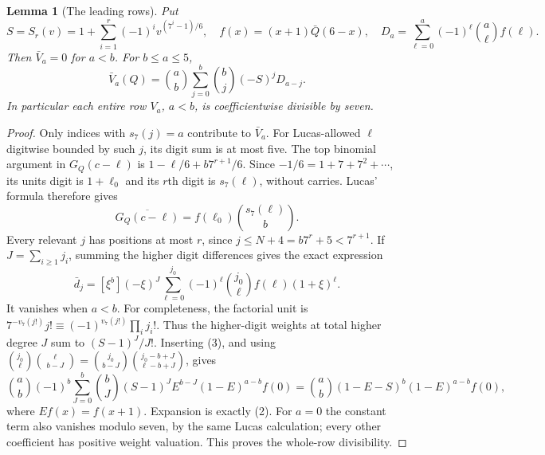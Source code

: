 \documentclass[11pt]{article}
\newtheorem{lemma}{Lemma}
\begin{document}
\begin{lemma}[The leading rows]\label{lem:digit-rows}
Put
\[
 S=S_r(v)=1+\sum_{i=1}^r(-1)^iv^{(7^i-1)/6},\quad
 f(x)=(x+1)\bar Q(6-x),\quad
 D_a=\sum_{\ell=0}^a(-1)^\ell\binom a\ell f(\ell).
\]
Then $\bar V_a=0$ for $a<b$.  For $b\le a\le5$,
\[
 \bar V_a(Q)=\binom ab\sum_{j=0}^b
                   \binom bj(-S)^jD_{a-j}.              \tag{2}
\]
In particular each entire row $V_a$, $a<b$, is coefficientwise
divisible by seven.
\end{lemma}
\begin{proof}
Only indices with $s_7(j)=a$ contribute to $\bar V_a$.
For Lucas-allowed $\ell$ digitwise bounded by such $j$, its digit
sum is at most five.
The top binomial argument in $G_Q(c-\ell)$ is
$1-\ell/6+b7^{r+1}/6$.
Since $-1/6=1+7+7^2+\cdots$, its units digit is $1+\ell_0$
and its $r$th digit is $s_7(\ell)$, without carries.
Lucas' formula therefore gives
\[
 \overline{G_Q(c-\ell)}
      =f(\ell_0)\binom{s_7(\ell)}b .
\]
Every relevant $j$ has positions at most $r$, since
$j\le N+4=b7^r+5<7^{r+1}$.
If $J=\sum_{i\ge1}j_i$, summing the higher digit differences gives
the exact expression
\[
 \bar d_j=[\xi^b](-\xi)^J
   \sum_{\ell=0}^{j_0}(-1)^\ell
                 \binom{j_0}{\ell}f(\ell)(1+\xi)^\ell.   \tag{3}
\]
It vanishes when $a<b$.
For completeness, the factorial unit is
$7^{-v_7(j!)}j!\equiv(-1)^{v_7(j!)}\prod_i j_i!$.
Thus the higher-digit weights at total higher degree $J$ sum to
$(S-1)^J/J!$.
Inserting (3), and using
$\binom{j_0}{\ell}\binom{\ell}{b-J}
 =\binom{j_0}{b-J}\binom{j_0-b+J}{\ell-b+J}$,
gives
\[
 \binom ab(-1)^b
   \sum_{J=0}^b\binom bJ(S-1)^J
             E^{b-J}(1-E)^{a-b}f(0)
 =\binom ab(1-E-S)^b(1-E)^{a-b}f(0),
\]
where $Ef(x)=f(x+1)$.
Expansion is exactly (2).
For $a=0$ the constant term also vanishes modulo seven, by the
same Lucas calculation; every other coefficient has positive
weight valuation.  This proves the whole-row divisibility.
\end{proof}
\end{document}
